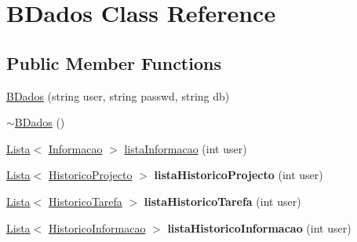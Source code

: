 \hypertarget{class_b_dados}{\section{B\-Dados Class Reference}
\label{class_b_dados}
}
\subsection*{Public Member Functions}
\begin{DoxyCompactItemize}
\item 
\hyperlink{class_b_dados_adc2d1a121f591fba3baadda2af50547a}{B\-Dados} (string user, string passwd, string db)
\item 
\hyperlink{class_b_dados_afea271b4cf5011f15e1949f3d107d781}{$\sim$\-B\-Dados} ()
\item 
\hyperlink{class_lista}{Lista}$<$ \hyperlink{class_informacao}{Informacao} $>$ \hyperlink{class_b_dados_a74d0d709f5af118dad104fa6f7312182}{lista\-Informacao} (int user)
\item 
\hypertarget{class_b_dados_a15b379c2030086eedc2d1b319c57dcb6}{\hyperlink{class_lista}{Lista}$<$ \hyperlink{class_historico_projecto}{Historico\-Projecto} $>$ {\bfseries lista\-Historico\-Projecto} (int user)}\label{class_b_dados_a15b379c2030086eedc2d1b319c57dcb6}

\item 
\hypertarget{class_b_dados_a90487b856ea0f1cb2096a2de24eda700}{\hyperlink{class_lista}{Lista}$<$ \hyperlink{class_historico_tarefa}{Historico\-Tarefa} $>$ {\bfseries lista\-Historico\-Tarefa} (int user)}\label{class_b_dados_a90487b856ea0f1cb2096a2de24eda700}

\item 
\hypertarget{class_b_dados_acfa9c7caec5717f20d49e6b05852cdec}{\hyperlink{class_lista}{Lista}$<$ \hyperlink{class_historico_informacao}{Historico\-Informacao} $>$ {\bfseries lista\-Historico\-Informacao} (int user)}\label{class_b_dados_acfa9c7caec5717f20d49e6b05852cdec}


\end{DoxyCompactItemize}
